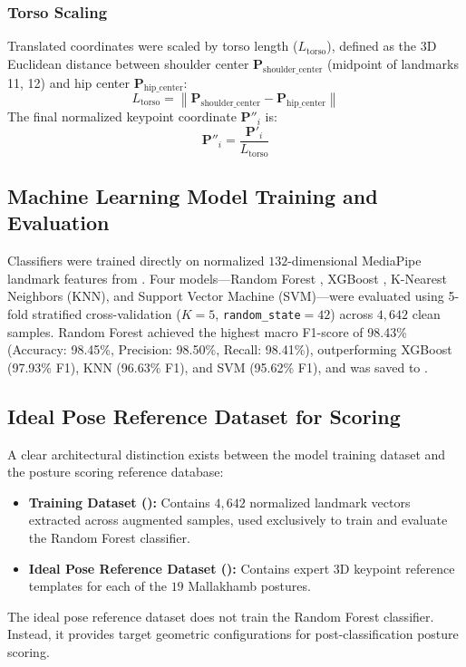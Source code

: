 \documentclass{ieeeaccess}
\begin{document}
\subsubsection{Torso Scaling}
Translated coordinates were scaled by torso length ($L_{\mathrm{torso}}$), defined as the 3D Euclidean distance between shoulder center $\mathbf{P}_{\mathrm{shoulder\_center}}$ (midpoint of landmarks 11, 12) and hip center $\mathbf{P}_{\mathrm{hip\_center}}$:
\begin{equation}
L_{\mathrm{torso}} = \left\lVert \mathbf{P}_{\mathrm{shoulder\_center}} - \mathbf{P}_{\mathrm{hip\_center}} \right\rVert
\label{eq:torso_scaling}
\end{equation}
The final normalized keypoint coordinate $\mathbf{P}''_i$ is:
\begin{equation}
\mathbf{P}''_i = \frac{\mathbf{P}'_i}{L_{\mathrm{torso}}}
\label{eq:normalization}
\end{equation}

\subsection{Machine Learning Model Training and Evaluation}
Classifiers were trained directly on normalized $132$-dimensional MediaPipe landmark features from . Four models—Random Forest \cite{b26}, XGBoost \cite{b21}, K-Nearest Neighbors (KNN), and Support Vector Machine (SVM)—were evaluated using 5-fold stratified cross-validation ($K=5$, \texttt{random\_state}$=42$) across $4,642$ clean samples. Random Forest achieved the highest macro F1-score of 98.43\% (Accuracy: 98.45\%, Precision: 98.50\%, Recall: 98.41\%), outperforming XGBoost (97.93\% F1), KNN (96.63\% F1), and SVM (95.62\% F1), and was saved to .

\subsection{Ideal Pose Reference Dataset for Scoring}
A clear architectural distinction exists between the model training dataset and the posture scoring reference database:
\begin{itemize}
    \item \textbf{Training Dataset ():} Contains $4,642$ normalized landmark vectors extracted across augmented samples, used exclusively to train and evaluate the Random Forest classifier.
    \item \textbf{Ideal Pose Reference Dataset ():} Contains expert 3D keypoint reference templates for each of the $19$ Mallakhamb postures.
\end{itemize}
The ideal pose reference dataset does not train the Random Forest classifier. Instead, it provides target geometric configurations for post-classification posture scoring.
\end{document}
